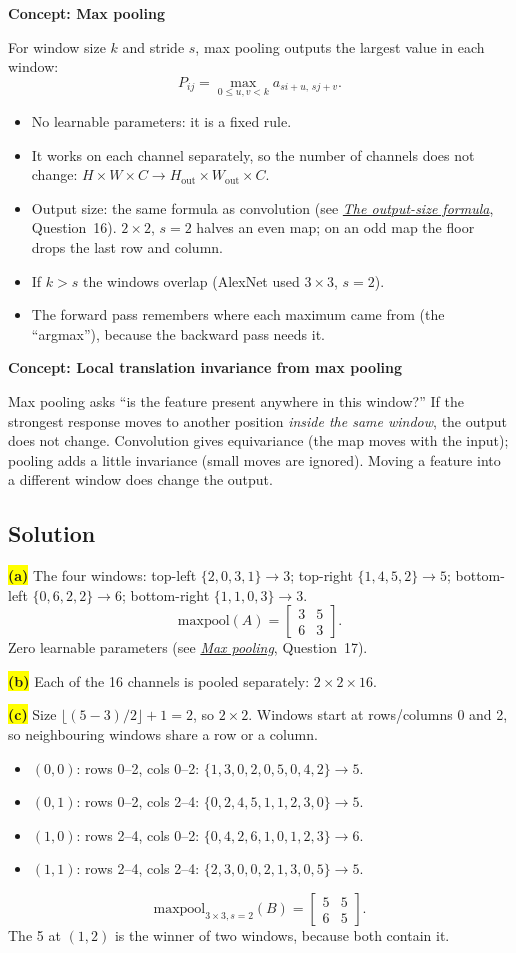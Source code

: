\documentclass[12pt,a4paper]{article}
\newcommand{\concept}[2]{\par\medskip\phantomsection\label{#1}{\large\bfseries\color{blue!50!black} Concept: #2}\par}
\newcommand{\seeconcept}[3]{(see \hyperref[#1]{\textit{#2}}, Question~#3)}
\newcommand{\hlq}[1]{{\setlength{\fboxsep}{1.5pt}\colorbox{yellow}{#1}}}
\begin{document}
\concept{c:maxpool}{Max pooling}
For window size $k$ and stride $s$, max pooling outputs the largest value in each window:
\[
P_{ij}=\max_{0\le u,v<k}a_{si+u,\,sj+v}.
\]
\begin{itemize}[nosep]
\item No learnable parameters: it is a fixed rule.
\item It works on each channel separately, so the number of channels does not change: $H\times W\times C\to H_{\text{out}}\times W_{\text{out}}\times C$.
\item Output size: the same formula as convolution \seeconcept{c:outsize}{The output-size formula}{16}. $2\times2$, $s=2$ halves an even map; on an odd map the floor drops the last row and column.
\item If $k>s$ the windows overlap (AlexNet used $3\times3$, $s=2$).
\item The forward pass remembers where each maximum came from (the ``argmax''), because the backward pass needs it.
\end{itemize}

\concept{c:invariance}{Local translation invariance from max pooling}
Max pooling asks ``is the feature present anywhere in this window?'' If the strongest response moves to another position \emph{inside the same window}, the output does not change. Convolution gives equivariance (the map moves with the input); pooling adds a little invariance (small moves are ignored). Moving a feature into a different window does change the output.

\subsection*{Solution}
\hlq{\textbf{(a)}} The four windows: top-left $\{2,0,3,1\}\to3$; top-right $\{1,4,5,2\}\to5$; bottom-left $\{0,6,2,2\}\to6$; bottom-right $\{1,1,0,3\}\to3$.
\[
\text{maxpool}(A)=\begin{bmatrix}3&5\\6&3\end{bmatrix}.
\]
Zero learnable parameters \seeconcept{c:maxpool}{Max pooling}{17}.

\hlq{\textbf{(b)}} Each of the 16 channels is pooled separately: $2\times2\times16$.

\hlq{\textbf{(c)}} Size $\lfloor(5-3)/2\rfloor+1=2$, so $2\times2$. Windows start at rows/columns 0 and 2, so neighbouring windows share a row or a column.
\begin{itemize}[nosep]
\item $(0,0)$: rows 0--2, cols 0--2: $\{1,3,0,2,0,5,0,4,2\}\to5$.
\item $(0,1)$: rows 0--2, cols 2--4: $\{0,2,4,5,1,1,2,3,0\}\to5$.
\item $(1,0)$: rows 2--4, cols 0--2: $\{0,4,2,6,1,0,1,2,3\}\to6$.
\item $(1,1)$: rows 2--4, cols 2--4: $\{2,3,0,0,2,1,3,0,5\}\to5$.
\end{itemize}
\[
\text{maxpool}_{3\times3,s=2}(B)=\begin{bmatrix}5&5\\6&5\end{bmatrix}.
\]
The 5 at $(1,2)$ is the winner of two windows, because both contain it.
\end{document}
